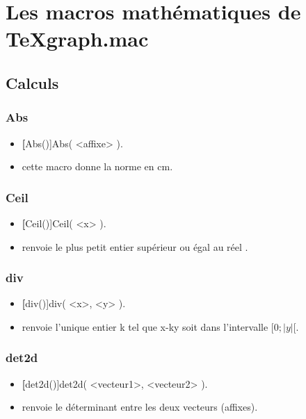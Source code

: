\chapter{Les macros mathématiques de TeXgraph.mac}

\section{Calculs}

\subsection{Abs}

\begin{itemize}
 \item \util \textbf[Abs()]{Abs( <affixe> )}.
 \item \desc cette macro donne la norme en cm.
\end{itemize}

\subsection{Ceil}

\begin{itemize}
 \item \util \textbf[Ceil()]{Ceil( <x> )}.
 \item \desc renvoie le plus petit entier supérieur ou égal au réel .
\end{itemize}

\subsection{div}

\begin{itemize}
 \item \util \textbf[div()]{div( <x>, <y> )}.
 \item \desc renvoie l'unique entier k tel que x-ky soit dans l'intervalle $[0;|y|[$.
\end{itemize}

\subsection{det2d}

\begin{itemize}
 \item \util \textbf[det2d()]{det2d( <vecteur1>, <vecteur2> )}.
 \item \desc renvoie le déterminant entre les deux vecteurs (affixes).
\end{itemize}

